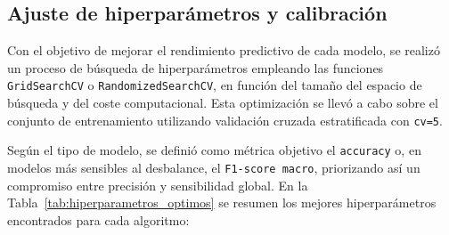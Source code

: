 \subsection{Ajuste de hiperparámetros y calibración}

Con el objetivo de mejorar el rendimiento predictivo de cada modelo, se realizó un proceso de búsqueda de hiperparámetros empleando las funciones \texttt{GridSearchCV} o \texttt{RandomizedSearchCV}, en función del tamaño del espacio de búsqueda y del coste computacional. Esta optimización se llevó a cabo sobre el conjunto de entrenamiento utilizando validación cruzada estratificada con \texttt{cv=5}.

Según el tipo de modelo, se definió como métrica objetivo el \texttt{accuracy} o, en modelos más sensibles al desbalance, el \texttt{F1-score macro}, priorizando así un compromiso entre precisión y sensibilidad global. En la Tabla~\ref{tab:hiperparametros_optimos} se resumen los mejores hiperparámetros encontrados para cada algoritmo:

\begin{table}[H]
\centering
{}
\caption{Mejores hiperparámetros obtenidos tras la búsqueda para cada modelo.}
\label{tab:hiperparametros_optimos}
\end{table}


